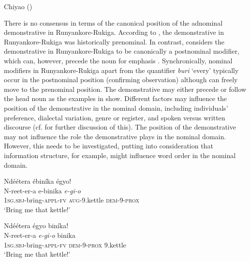 \documentclass[output=paper 		  ]{langscibook}
\begin{document}
\ea%
    \label{ex:asiimwe:31} Chiyao ()\\
    \label{ex:asiimwe:31a}

    \label{ex:asiimwe:31b}
    \z
\z



There is no consensus in terms of the canonical position of the adnominal demonstrative in Run\-yan\-ko\-re-Ru\-ki\-ga. According to \citet{Wald1973}, the demonstrative in Run\-yan\-ko\-re-Ru\-ki\-ga was historically prenominal. In contrast, \citet{Taylor1985} considers the demonstrative in Run\-yan\-ko\-re-Ru\-ki\-ga to be canonically a postnominal modifier, which can, however, precede the noun for emphasis \citep[89]{Taylor1985}. Synchronically, nominal modifiers in Run\-yan\-ko\-re-Ru\-ki\-ga apart from the quantifier \textit{buri} ‘every’ typically occur in the postnominal position (confirming  observation) although can freely move to the prenominal position. The demonstrative may either precede or follow the head noun as the examples in  show. Different factors may influence the position of the demonstrative in the nominal domain, including individuals’ preference, dialectal variation, genre or register, and spoken versus written discourse (cf. \citealt{Asiimwe2014} for further discussion of this). The position of the demonstrative may not influence the role the demonstrative plays in the nominal domain. However, this needs to be investigated, putting into consideration that information structure, for example, might influence word order in the nominal domain.

\ea%
    \label{ex:asiimwe:32}
    \ea\label{ex:asiimwe:32a}  Ndéétera ébiníka égyo!\\
 \gll N-reet-er-a  e-binika  \emph{e-gi-o}\\
  1\textsc{sg.sbj}{}-bring-\textsc{appl}-\textsc{fv}  \textsc{aug}{}-9.kettle  \textsc{dem}{}-9-\textsc{prox}  \\
    \glt ‘Bring me that kettle!’

  \ex\label{ex:asiimwe:32b}  Ndéétera égyo biníka!\\
 \gll N-reet-er-a  \emph{e-gi-o}  binika\\
  1\textsc{sg.sbj}{}-bring-\textsc{appl}-\textsc{fv}  \textsc{dem}{}-9-\textsc{prox}  9.kettle\\
  \glt ‘Bring me that kettle!’
    \z
\z
\end{document}
